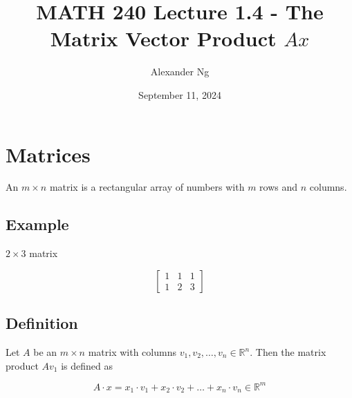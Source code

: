 \documentclass[12pt]{article}
\begin{document}
\title{MATH 240 Lecture 1.4 - The Matrix Vector Product $Ax$}
\author{Alexander Ng}
\date{September 11, 2024}

\maketitle

\section{Matrices}

An \( m \times n \) matrix is a rectangular array of numbers with \( m \) rows
and \( n \) columns.

\subsection{Example}

\begin{minipage}{0.3\textwidth}
  \centering
  \( 2 \times 3 \) matrix
\end{minipage}
\begin{minipage}{0.5\textwidth}
  \begin{equation}
    \begin{bmatrix}
      1 & 1 & 1 \\
      1 & 2 & 3
    \end{bmatrix}
  \end{equation}
\end{minipage}

\subsection{Definition}

Let \( A \) be an \( m \times n \) matrix with columns \( v_{1}, v_{2},\ldots ,
v_{n} \in \mathbb{R}^{n} \). Then the matrix product \( Av_{1} \) is defined as

$$
  A \cdot x = x_{1} \cdot v_{1} + x_{2} \cdot v_{2} + \ldots + x_{n} \cdot v_{n} \in \mathbb{R}^{m}
$$
\end{document}
